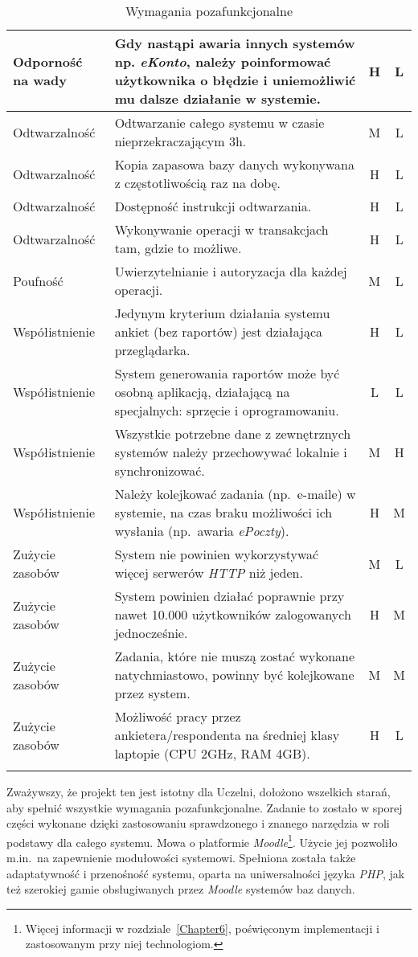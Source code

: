 \begin{center}
\begin{longtable}{ | p{4cm} | p{9cm} | c | c | }
%
Odporność na wady & Gdy nastąpi awaria innych systemów np. \textit{eKonto}, należy poinformować użytkownika o błędzie i uniemożliwić mu dalsze działanie w systemie. & H & L \\ \hline
%
Odtwarzalność & Odtwarzanie całego systemu w czasie nieprzekraczającym 3h. & M & L \\ \hline
Odtwarzalność & Kopia zapasowa bazy danych wykonywana z częstotliwością raz na dobę. & H & L \\ \hline
Odtwarzalność & Dostępność instrukcji odtwarzania. & H & L \\ \hline
Odtwarzalność & Wykonywanie operacji w transakcjach tam, gdzie to możliwe. & H & L \\ \hline
%
Poufność & Uwierzytelnianie i autoryzacja dla każdej operacji. & M & L \\ \hline
%
Współistnienie & Jedynym kryterium działania systemu ankiet (bez raportów) jest działająca przeglądarka. & H & L \\ \hline
Współistnienie & System generowania raportów może być osobną aplikacją, działającą na specjalnych: sprzęcie i oprogramowaniu. & L & L \\ \hline
Współistnienie & Wszystkie potrzebne dane z zewnętrznych systemów należy przechowywać lokalnie i synchronizować. & M & H \\ \hline
Współistnienie & Należy kolejkować zadania (np.~e-maile) w systemie, na czas braku możliwości ich wysłania (np.~awaria \textit{ePoczty}). & H & M \\ \hline
%
Zużycie zasobów & System nie powinien wykorzystywać więcej serwerów \textit{HTTP} niż jeden. & M & L \\ \hline
Zużycie zasobów & System powinien działać poprawnie przy nawet 10.000 użytkowników zalogowanych jednocześnie. & H & M \\ \hline
Zużycie zasobów & Zadania, które nie muszą zostać wykonane natychmiastowo, powinny być kolejkowane przez system. & M & M \\ \hline
Zużycie zasobów & Możliwość pracy przez ankietera\slash respondenta na średniej klasy laptopie (CPU 2GHz, RAM 4GB). & H & L \\ \hline
%
\caption{Wymagania pozafunkcjonalne}\label{tab:reqs}
\end{longtable}
\end{center}

Zważywszy, że projekt ten jest istotny dla Uczelni, dołożono wszelkich starań, aby spełnić wszystkie wymagania pozafunkcjonalne. Zadanie to zostało w sporej części wykonane dzięki zastosowaniu sprawdzonego i znanego narzędzia w roli podstawy dla całego systemu. Mowa o platformie \textit{Moodle}\footnote{Więcej informacji w rozdziale~\ref{Chapter6}, poświęconym implementacji i zastosowanym przy niej technologiom.}. Użycie jej pozwoliło m.in.~na zapewnienie modułowości systemowi. Spełniona została także adaptatywność i przenośność systemu, oparta na uniwersalności języka \textit{PHP}, jak też szerokiej gamie obsługiwanych przez \textit{Moodle} systemów baz danych. \\

